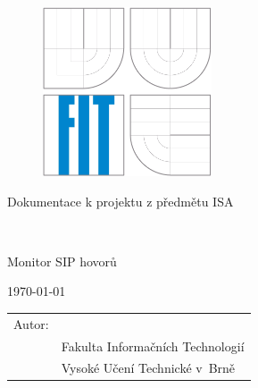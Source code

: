 \begin{titlepage}

\begin{figure}[!h]
  \centering
  \includegraphics[height=5cm]{logo}
\end{figure}

\vfill

\begin{center}
\begin{Large}
Dokumentace k projektu z předmětu ISA\\
\end{Large}
\bigskip
\begin{Huge}
\projname\\
\end{Huge}
\begin{large}
Monitor SIP hovorů
\end{large}
\end{center}

\vfill

\begin{center}
\begin{Large}
\today
\end{Large}
\end{center}

\vfill

\begin{flushleft}
\begin{large}
\begin{tabular}{ll}
Autor: & \author, \url{\email} \\
 & Fakulta Informačních Technologií \\
 & Vysoké Učení Technické v~Brně \\
\end{tabular}
\end{large}
\end{flushleft}
\end{titlepage}
